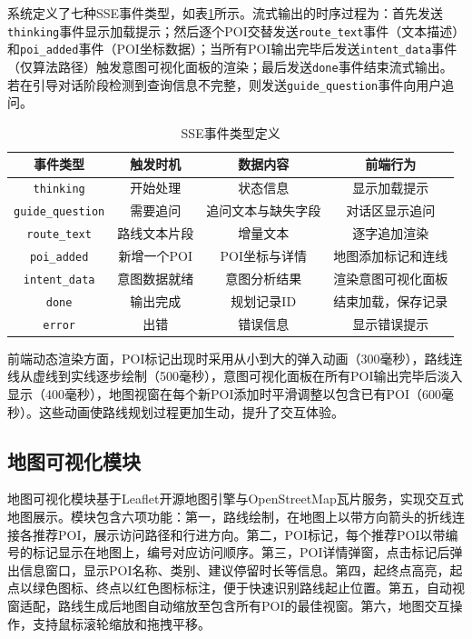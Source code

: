 系统定义了七种SSE事件类型，如表\ref{tab:ch5_sse_events}所示。流式输出的时序过程为：首先发送\texttt{thinking}事件显示加载提示；然后逐个POI交替发送\texttt{route\_text}事件（文本描述）和\texttt{poi\_added}事件（POI坐标数据）；当所有POI输出完毕后发送\texttt{intent\_data}事件（仅算法路径）触发意图可视化面板的渲染；最后发送\texttt{done}事件结束流式输出。若在引导对话阶段检测到查询信息不完整，则发送\texttt{guide\_question}事件向用户追问。

\begin{table}[hbt]
  \centering
  \caption{SSE事件类型定义}
  \label{tab:ch5_sse_events}
  \begin{tabular*}{0.95\textwidth}{@{\extracolsep{\fill}}cccc}
  \toprule
    事件类型 & 触发时机 & 数据内容 & 前端行为 \\
  \midrule
    \texttt{thinking} & 开始处理 & 状态信息 & 显示加载提示 \\
    \texttt{guide\_question} & 需要追问 & 追问文本与缺失字段 & 对话区显示追问 \\
    \texttt{route\_text} & 路线文本片段 & 增量文本 & 逐字追加渲染 \\
    \texttt{poi\_added} & 新增一个POI & POI坐标与详情 & 地图添加标记和连线 \\
    \texttt{intent\_data} & 意图数据就绪 & 意图分析结果 & 渲染意图可视化面板 \\
    \texttt{done} & 输出完成 & 规划记录ID & 结束加载，保存记录 \\
    \texttt{error} & 出错 & 错误信息 & 显示错误提示 \\
  \bottomrule
  \end{tabular*}
\end{table}

前端动态渲染方面，POI标记出现时采用从小到大的弹入动画（300毫秒），路线连线从虚线到实线逐步绘制（500毫秒），意图可视化面板在所有POI输出完毕后淡入显示（400毫秒），地图视窗在每个新POI添加时平滑调整以包含已有POI（600毫秒）。这些动画使路线规划过程更加生动，提升了交互体验。

\subsection{地图可视化模块}
\label{sec:ch5_map}

地图可视化模块基于Leaflet开源地图引擎与OpenStreetMap瓦片服务，实现交互式地图展示。模块包含六项功能：第一，路线绘制，在地图上以带方向箭头的折线连接各推荐POI，展示访问路径和行进方向。第二，POI标记，每个推荐POI以带编号的标记显示在地图上，编号对应访问顺序。第三，POI详情弹窗，点击标记后弹出信息窗口，显示POI名称、类别、建议停留时长等信息。第四，起终点高亮，起点以绿色图标、终点以红色图标标注，便于快速识别路线起止位置。第五，自动视窗适配，路线生成后地图自动缩放至包含所有POI的最佳视窗。第六，地图交互操作，支持鼠标滚轮缩放和拖拽平移。

